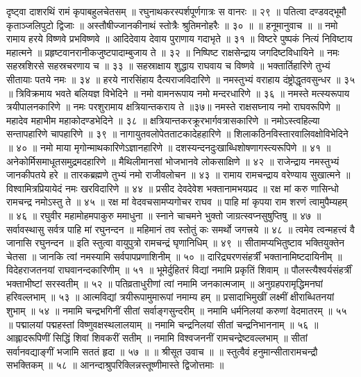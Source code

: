 दृष्ट्वा दाशरथिं रामं कृपाबहुलचेतसम् ॥
रघुनाथकरस्पर्शपूर्णगात्रः स वानरः ॥ २९ ॥
पतित्वा दण्डवद्भूमौ कृताञ्जलिपुटो द्विजाः ॥
अस्तौषीज्जानकीनाथं स्तोत्रैः श्रुतिमनोहरैः ॥ ३० ॥
॥ हनूमानुवाच ॥ ॥
नमो रामाय हरये विष्णवे प्रभविष्णवे ॥
आदिदेवाय देवाय पुराणाय गदाभृते ॥ ३१ ॥
विष्टरे पुष्पकं नित्यं निविष्टाय महात्मने ॥
प्रहृष्टवानरानीकजुष्टपादाम्बुजाय ते ॥ ३२ ॥
निष्पिष्ट राक्षसेन्द्राय जगदिष्टविधायिने ॥
नमः सहस्रशिरसे सहस्रचरणाय च ॥ ३३ ॥
सहस्राक्षाय शुद्धाय राघवाय च विष्णवे ॥
भक्तार्तिहारिणे तुभ्यं सीतायाः पतये नमः ॥ ३४ ॥
हरये नारसिंहाय दैत्यराजविदारिणे ॥
नमस्तुभ्यं वराहाय दंष्ट्रोद्धृतवसुन्धर ॥ ३५ ॥
त्रिविक्रमाय भवते बलियज्ञ विभेदिने ॥
नमो वामनरूपाय नमो मन्दरधारिणे ॥ ३६ ॥
नमस्ते मत्स्यरूपाय त्रयीपालनकारिणे ॥
नमः परशुरामाय क्षत्रियान्तकराय ते ॥३७॥
नमस्ते राक्षसघ्नाय नमो राघवरूपिणे ॥
महादेव महाभीम महाकोदण्डभेदिने ॥ ३८ ॥
क्षत्रियान्तकरक्रूरभार्गवत्रासकारिणे ॥
नमोऽस्त्वहिल्या सन्तापहारिणे चापहारिणे ॥ ३९ ॥
नागायुतवलोपेतताटकादेहहारिणे ॥
शिलाकठिनविस्तारवालिवक्षोविभेदिने ॥ ४० ॥
नमो माया मृगोन्माथकारिणेऽज्ञानहारिणे ॥
दशस्यन्दनदुःखाब्धिशोषणागस्त्यरूपिणे ॥ ४१ ॥
अनेकोर्मिसमाधूतसमुद्रमदहारिणे ॥
मैथिलीमानसां भोजभानवे लोकसाक्षिणे ॥ ४२ ॥
राजेन्द्राय नमस्तुभ्यं जानकीपतये हरे ॥
तारकब्रह्मणे तुभ्यं नमो राजीवलोचन ॥ ४३ ॥
रामाय रामचन्द्राय वरेण्याय सुखात्मने ॥
विश्वामित्रप्रियायेदं नमः खरविदारिणे ॥ ४४ ॥
प्रसीद देवदेवेश भक्तानामभयप्रद ॥
रक्ष मां करु णासिन्धो रामचन्द्र नमोऽस्तु ते ॥ ४५ ॥
रक्ष मां वेदवचसामप्यगोचर राघव ॥
पाहि मां कृपया राम शरणं त्वामुपैम्यहम् ॥ ४६ ॥
रघुवीर महामोहमपाकुरु ममाधुना ॥
स्नाने चाचमने भुक्तो जाग्रत्स्वप्नसुषुप्तिषु ॥ ४७ ॥
सर्वावस्थासु सर्वत्र पाहि मां रघुनन्दन ॥
महिमानं तव स्तोतुं कः समर्थो जगत्त्रये ॥ ४८ ॥
त्वमेव त्वन्महत्त्वं वै जानासि रघुनन्दन ॥
इति स्तुत्वा वायुपुत्रो रामचन्द्रं घृणानिधिम् ॥ ४९ ॥
सीतामप्यभितुष्टाव भक्तियुक्तेन चेतसा ॥
जानकि त्वां नमस्यामि सर्वपापप्रणाशिनीम् ॥ ५० ॥
दारिद्र्यरणसंहर्त्रीं भक्तानामिष्टदायिनीम् ॥
विदेहराजतनयां राघवानन्दकारिणीम् ॥ ५१ ॥
भूमेर्दुहितरं विद्यां नमामि प्रकृतिं शिवाम् ॥
पौलस्त्यैश्वर्यसंहर्त्रीं भक्ताभीष्टां सरस्वतीम् ॥ ५२ ॥
पतिव्रताधुरीणां त्वां नमामि जनकात्मजाम् ॥
अनुग्रहपरामृद्धिमनघां हरिवल्लभाम् ॥ ५३ ॥
आत्मविद्यां त्रयीरूपामुमारूपां नमाम्य हम् ॥
प्रसादाभिमुखीं लक्ष्मीं क्षीराब्धितनयां शुभाम् ॥ ५४ ॥
नमामि चन्द्रभगिनीं सीतां सर्वाङ्गसुन्दरीम् ॥
नमामि धर्मनिलयां करुणां वेदमातरम् ॥ ५५ ॥
पद्मालयां पद्महस्तां विष्णुवक्षस्थलालयाम् ॥
नमामि चन्द्रनिलयां सीतां चन्द्रनिभाननाम् ॥ ५६ ॥
आह्लादरूपिणीं सिद्धिं शिवां शिवकरीं सतीम् ॥
नमामि विश्वजननीं रामचन्द्रेष्टवल्लभाम् ॥
सीतां सर्वानवद्याङ्गीं भजामि सततं हृदा ॥ ५७ ॥
॥ श्रीसूत उवाच ॥ ॥
स्तुत्वैवं हनुमान्सीतारामचन्द्रौ सभक्तिकम् ॥ ५८ ॥
आनन्दाश्रुपरिक्लिन्नस्तूष्णीमास्ते द्विजोत्तमाः ॥
